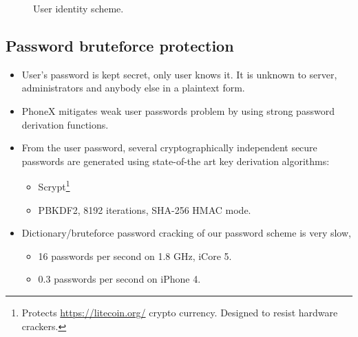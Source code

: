 \documentclass[a4paper,10pt]{article}
\begin{document}
\begin{center}
\begin{figure}[h!]
\centering
{}
\caption{User identity scheme.}
\label{fig:identity}
\end{figure}
\end{center}

\subsection{Password bruteforce protection}
\begin{itemize}
 \item User's password is kept secret, only user knows it. It is unknown to server, administrators and anybody else in a plaintext form. 
 \item PhoneX mitigates weak user passwords problem by using strong password derivation functions.
 \item From the user password, several cryptographically independent secure passwords are generated using state-of-the art key derivation algorithms:
\begin{itemize}
 \item Scrypt\footnote{Protects \url{https://litecoin.org/} crypto currency. Designed to resist hardware crackers.}
 \item PBKDF2, 8192 iterations, SHA-256 HMAC mode.
\end{itemize}
 \item Dictionary/bruteforce password cracking of our password scheme is very slow, 
\begin{itemize}
 \item 16 passwords per second on 1.8 GHz, iCore 5.
 \item 0.3 passwords per second on iPhone 4.
\end{itemize}
\end{itemize}
\end{document}
